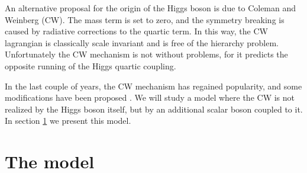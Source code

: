 \documentclass[aps,prd,preprintnumbers,nofootinbibn,twocolumn]{revtex4}
\begin{document}
An alternative proposal for the origin of the Higgs boson is due to Coleman and Weinberg \cite{Coleman:1973jx} (CW). The mass term is set to zero, and the symmetry breaking is caused by radiative corrections to the quartic term. In this way, the CW lagrangian is classically scale invariant and is free of the hierarchy problem. Unfortunately the CW mechanism is not without problems, for it predicts the opposite running of the Higgs quartic coupling.  

In the last couple of years, the CW mechanism has regained popularity, and some modifications have been proposed \cite{Dermisek:2013pta, Hill:2014mqa, Antipin:2015kgh}.  We will study a model where the CW is not realized by the Higgs boson itself, but by an additional scalar boson coupled to it. In section \ref{sect:model} we present this model.

\section{The model} \label{sect:model}


 

\newpage
\clearpage
\end{document}
